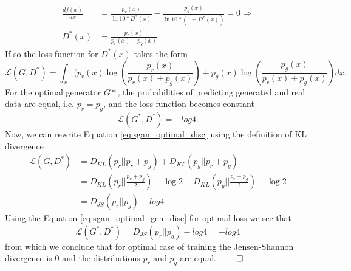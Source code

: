 \begin{equation*}
\begin{split}
  \frac{df(x)}{dx} & = \frac{p_r(x)}{\ln{10} * D^*(x)} - \frac{p_g(x)}{\ln{10} * (1-D^*(x))} = 0 \Rightarrow \\
  D^*(x) & = \frac{p_r(x)}{p_r(x) + p_g(x)}
\end{split}
\end{equation*}
If so the loss function for $D^*(x)$ takes the form
\begin{equation}
  \mathcal{L}(G, D^*) = \int_x(p_r(x)\log{(\frac{p_r(x)}{p_r(x) + p_g(x)})} + p_g(x)\log{(\frac{p_g(x)}{p_r(x) + p_g(x)})}dx.
  \label{eq:sgan_optimal_disc}
\end{equation}
For the optimal generator $G*$, the probabilities of predicting generated and
real data are equal, i.e. $p_r=p_g$, and the loss function becomes constant
\begin{equation}
\mathcal{L}(G^*, D^*) = -log{4}.
\label{eq:sgan_optimal_gen_disc}
\end{equation}
Now, we can rewrite Equation \ref{eq:sgan_optimal_disc} using the definition of KL
divergence
\begin{equation*}
  \begin{split}
    \mathcal{L}(G, D^*) & = D_{KL}(p_r || p_r + p_g) + D_{KL}(p_g || p_r + p_g) \\ 
    & = D_{KL}(p_r || \frac{p_r + p_g}{2}) - \log{2} + D_{KL}(p_g || \frac{p_r + p_g}{2}) -\log{2} \\
    & = D_{JS}(p_r || p_g) - log{4}
  \end{split}
\end{equation*}
Using the Equation \ref{eq:sgan_optimal_gen_disc} for optimal loss we see that
\begin{equation*}
  \mathcal{L}(G^*, D^*) = D_{JS}(p_r || p_g) -log{4} =  - log{4}
\end{equation*}
from which we conclude that for optimal case of training the Jensen-Shannon
divergence is $0$ and the distributions $p_r$ and $p_q$ are equal. $\qed$



\let\oldclearpage\clearpage
\let\clearpage\relax
